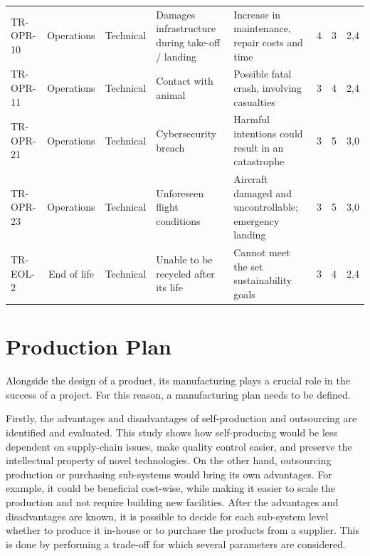 \begin{table}[h]
{\begin{tabular}{lccllccS[table-format=1.1]}
TR-OPR-10 & Operations  & Technical  & Damages infrastructure during take-off / landing & Increase in maintenance, repair costs and time                & 4                & 3      & 2,4  \\
TR-OPR-11 & Operations  & Technical  & Contact with animal                              & Possible fatal crash, involving casualties                    & 3                & 4      & 2,4  \\
TR-OPR-21 & Operations  & Technical  & Cybersecurity breach                             & Harmful intentions could result in an catastrophe             & 3                & 5      & 3,0    \\
TR-OPR-23 & Operations  & Technical  & Unforeseen flight conditions                     & Aircraft damaged and uncontrollable; emergency landing        & 3                & 5      & 3,0    \\
TR-EOL-2  & End of life & Technical  & Unable to be recycled after its life             & Cannot meet  the set  sustainability goals                    & 3                & 4      & 2,4  \\ \hline

\end{tabular}%
}

\end{table}

\section*{Production Plan}
Alongside the design of a product, its manufacturing plays a crucial role in the success of a project.
For this reason, a manufacturing plan needs to be defined.

Firstly, the advantages and disadvantages of self-production and outsourcing are identified and evaluated.
This study shows how self-producing would be less dependent on supply-chain issues, make quality control easier, and preserve the intellectual property of novel technologies.
On the other hand, outsourcing production or purchasing sub-systems would bring its own advantages. For example, it could be beneficial cost-wise, while making it easier to scale the production and not require building new facilities. After the advantages and disadvantages are known, it is possible to decide for each sub-system level whether to produce it in-house or to purchase the products from a supplier.
This is done by performing a trade-off for which several parameters are considered.

